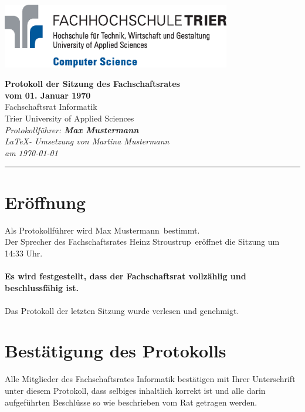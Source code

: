 \documentclass[a4paper, 11pt]{article} %
\newcommand{\protokoller}{Max Mustermann}
\newcommand{\dateOfMeeting}{01. Januar 1970}
\newcommand{\TeXer}{Martina Mustermann}
\newcommand{\fsiPresident}{Heinz Stroustrup}
\begin{document}

\doublespacing
\thispagestyle{empty}

\begin{center}
\includegraphics[width=10.0cm]{../logo_faculty_computer_science.eps}

\vspace*{\fill}
{\LARGE \textbf{Protokoll der Sitzung des Fachschaftsrates \\vom \dateOfMeeting}}\\
Fachschaftsrat Informatik\\
Trier University of Applied Sciences\\
\vspace{2.5cm}
\textit{
	Protokollführer: \textbf{\protokoller} \\
	\LaTeX - Umsetzung von \TeXer\\
	am \today
}
\vfill
\end{center}

\hspace*{-35cm}
\textcolor{fsi}{\rule{64.9cm}{15pt}}
\pagebreak
 
\setcounter{tocdepth}{2}
\tableofcontents 
\pagebreak

\section{Eröffnung}
Als Protokollführer wird \protokoller~bestimmt.\\
Der Sprecher des Fachschaftsrates \fsiPresident~eröffnet die Sitzung um 14:33 Uhr.
\\\\
\textbf{Es wird festgestellt, dass der Fachschaftsrat vollzählig und beschlussfähig ist.}
\\\\
Das Protokoll der letzten Sitzung wurde verlesen und genehmigt.

\pagebreak
\section{Bestätigung des Protokolls}
Alle Mitglieder des Fachschaftsrates Informatik bestätigen mit Ihrer Unterschrift unter diesem Protokoll, dass selbiges inhaltlich korrekt ist und alle darin aufgeführten Beschlüsse so wie beschrieben vom Rat getragen werden.
\\
\vspace{1.5cm}
\end{document}
